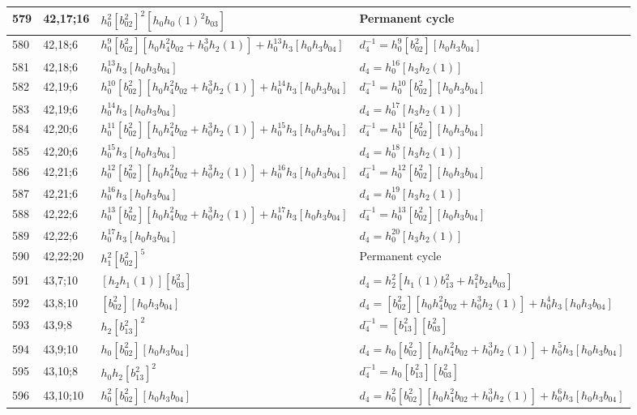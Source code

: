 \documentclass{article}
\begin{document}
\begin{longtable}{|l|l|>{\raggedright\arraybackslash}p{6cm}|>{\raggedright\arraybackslash}p{6cm}|}
\hline
579 & 42,17;16 & $h_0^2[b_{02}^2]^2[h_0h_0(1)^2b_{03}]$ & Permanent cycle\\
\hline
580 & 42,18;6 & $h_0^9[b_{02}^2][h_0h_4^2b_{02} + h_0^3h_2(1)] + h_0^{13}h_3[h_0h_3b_{04}]$ & $d_{4}^{-1}=h_0^9[b_{02}^2][h_0h_3b_{04}]$\\
581 & 42,18;6 & $h_0^{13}h_3[h_0h_3b_{04}]$ &$d_{4}=h_0^{16}[h_3h_2(1)]$\\
\hline
582 & 42,19;6 & $h_0^{10}[b_{02}^2][h_0h_4^2b_{02} + h_0^3h_2(1)] + h_0^{14}h_3[h_0h_3b_{04}]$ & $d_{4}^{-1}=h_0^{10}[b_{02}^2][h_0h_3b_{04}]$\\
583 & 42,19;6 & $h_0^{14}h_3[h_0h_3b_{04}]$ &$d_{4}=h_0^{17}[h_3h_2(1)]$\\
\hline
584 & 42,20;6 & $h_0^{11}[b_{02}^2][h_0h_4^2b_{02} + h_0^3h_2(1)] + h_0^{15}h_3[h_0h_3b_{04}]$ & $d_{4}^{-1}=h_0^{11}[b_{02}^2][h_0h_3b_{04}]$\\
585 & 42,20;6 & $h_0^{15}h_3[h_0h_3b_{04}]$ &$d_{4}=h_0^{18}[h_3h_2(1)]$\\
\hline
586 & 42,21;6 & $h_0^{12}[b_{02}^2][h_0h_4^2b_{02} + h_0^3h_2(1)] + h_0^{16}h_3[h_0h_3b_{04}]$ & $d_{4}^{-1}=h_0^{12}[b_{02}^2][h_0h_3b_{04}]$\\
587 & 42,21;6 & $h_0^{16}h_3[h_0h_3b_{04}]$ &$d_{4}=h_0^{19}[h_3h_2(1)]$\\
\hline
588 & 42,22;6 & $h_0^{13}[b_{02}^2][h_0h_4^2b_{02} + h_0^3h_2(1)] + h_0^{17}h_3[h_0h_3b_{04}]$ & $d_{4}^{-1}=h_0^{13}[b_{02}^2][h_0h_3b_{04}]$\\
589 & 42,22;6 & $h_0^{17}h_3[h_0h_3b_{04}]$ &$d_{4}=h_0^{20}[h_3h_2(1)]$\\
\hline
590 & 42,22;20 & $h_1^2[b_{02}^2]^5$ & Permanent cycle\\
\hline
591 & 43,7;10 & $[h_2h_1(1)][b_{03}^2]$ &$d_{4}=h_2^2[h_1(1)b_{13}^2 + h_1^2b_{24}b_{03}]$\\
\hline
592 & 43,8;10 & $[b_{02}^2][h_0h_3b_{04}]$ &$d_{4}=[b_{02}^2][h_0h_4^2b_{02} + h_0^3h_2(1)] + h_0^4h_3[h_0h_3b_{04}]$\\
\hline
593 & 43,9;8 & $h_2[b_{13}^2]^2$ & $d_{4}^{-1}=[b_{13}^2][b_{03}^2]$\\
\hline
594 & 43,9;10 & $h_0[b_{02}^2][h_0h_3b_{04}]$ &$d_{4}=h_0[b_{02}^2][h_0h_4^2b_{02} + h_0^3h_2(1)] + h_0^5h_3[h_0h_3b_{04}]$\\
\hline
595 & 43,10;8 & $h_0h_2[b_{13}^2]^2$ & $d_{4}^{-1}=h_0[b_{13}^2][b_{03}^2]$\\
\hline
596 & 43,10;10 & $h_0^2[b_{02}^2][h_0h_3b_{04}]$ &$d_{4}=h_0^2[b_{02}^2][h_0h_4^2b_{02} + h_0^3h_2(1)] + h_0^6h_3[h_0h_3b_{04}]$\\

\end{longtable}
\end{document}
